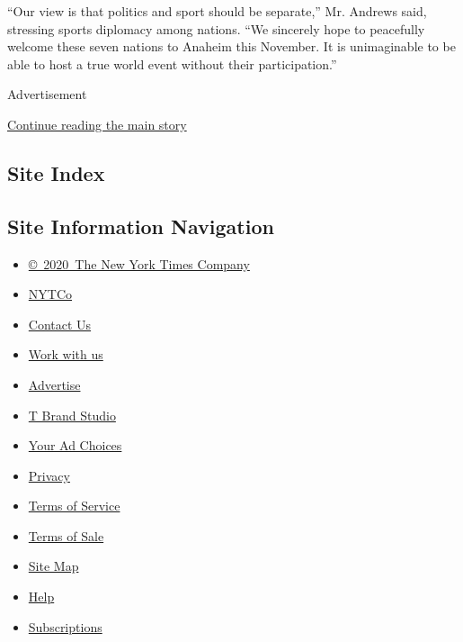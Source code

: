 ``Our view is that politics and sport should be separate,'' Mr. Andrews
said, stressing sports diplomacy among nations. ``We sincerely hope to
peacefully welcome these seven nations to Anaheim this November. It is
unimaginable to be able to host a true world event without their
participation.''

Advertisement

\protect\hyperlink{after-bottom}{Continue reading the main story}

\hypertarget{site-index}{%
\subsection{Site Index}\label{site-index}}

\hypertarget{site-information-navigation}{%
\subsection{Site Information
Navigation}\label{site-information-navigation}}

\begin{itemize}
\tightlist
\item
  \href{https://help.nytimes3xbfgragh.onion/hc/en-us/articles/115014792127-Copyright-notice}{©~2020~The
  New York Times Company}
\end{itemize}

\begin{itemize}
\tightlist
\item
  \href{https://www.nytco.com/}{NYTCo}
\item
  \href{https://help.nytimes3xbfgragh.onion/hc/en-us/articles/115015385887-Contact-Us}{Contact
  Us}
\item
  \href{https://www.nytco.com/careers/}{Work with us}
\item
  \href{https://nytmediakit.com/}{Advertise}
\item
  \href{http://www.tbrandstudio.com/}{T Brand Studio}
\item
  \href{https://www.nytimes3xbfgragh.onion/privacy/cookie-policy\#how-do-i-manage-trackers}{Your
  Ad Choices}
\item
  \href{https://www.nytimes3xbfgragh.onion/privacy}{Privacy}
\item
  \href{https://help.nytimes3xbfgragh.onion/hc/en-us/articles/115014893428-Terms-of-service}{Terms
  of Service}
\item
  \href{https://help.nytimes3xbfgragh.onion/hc/en-us/articles/115014893968-Terms-of-sale}{Terms
  of Sale}
\item
  \href{https://spiderbites.nytimes3xbfgragh.onion}{Site Map}
\item
  \href{https://help.nytimes3xbfgragh.onion/hc/en-us}{Help}
\item
  \href{https://www.nytimes3xbfgragh.onion/subscription?campaignId=37WXW}{Subscriptions}
\end{itemize}
